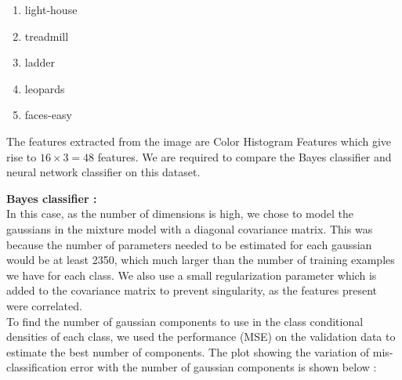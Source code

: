 \documentclass{article}
\begin{document}
\begin{enumerate}

\item    light-house

\item    treadmill

\item    ladder

\item    leopards

\item    faces-easy


\end{enumerate}

The features extracted from the image are Color Histogram Features which give rise to $16 \times 3 = 48$ features.  We are required to compare the Bayes classifier and neural network classifier on this dataset.


\begin{flushleft}

\textbf{Bayes classifier :} \\[10pt]

In this case, as the number of dimensions is high, we chose to model the gaussians in the  mixture model with a diagonal covariance matrix. This was because the number of parameters needed to be estimated for each gaussian would be at least 2350, which much larger than the number of training examples we have for each class. We also use a small regularization parameter which is added to the covariance matrix to prevent singularity, as the features present were correlated. \\[10pt]


To find the number of gaussian components to use in the class conditional densities of each class, we used the performance (MSE) on the validation data to estimate the best number of components. The plot showing the variation of mis-classification error with the number of gaussian components is shown below :

\end{flushleft}
\end{document}
